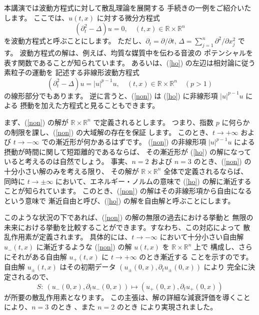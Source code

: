 \documentclass[uplatex,dvipdfmx]{jlreq}
\begin{document}
本講演では波動方程式に対して散乱理論を展開する
手続きの一例をご紹介いたします。
ここでは、$u(t,x)$ に対する微分方程式
\begin{equation}\label{ho}
(\partial_t^2-\Delta)u=0,
\quad (t,x)\in \mathbb{R} \times \mathbb{R}^n
\end{equation}
を波動方程式と呼ぶことにします。
ただし、$\partial_t=\partial/\partial t$,
$\Delta=\sum_{j=1}^n \partial^2/\partial x_j^2$ です。
波動方程式の解は、例えば、均質な媒質中を伝わる音波の
ポテンシャルを表す関数であることが知られています。
あるいは、(\ref{ho}) の左辺は相対論に従う素粒子の運動を
記述する非線形波動方程式
\begin{equation}\label{non}
(\partial_t^2-\Delta)u=|u|^{p-1}u,
\quad (t,x)\in {\mathbb R} \times {\mathbb R}^n \quad
(p>1)
\end{equation}
の線形部分でもあります。
逆に言うと、(\ref{non}) は (\ref{ho}) に非線形項
$|u|^{p-1}u$
による
摂動を加えた方程式と見ることもできます。

まず、(\ref{non}) の解が ${\mathbb R} \times {\mathbb R}^n$
で定義されるとします。
つまり、指数 $p$ に何らかの制限を課し、(\ref{non}) の大域解の存在を保証
します。
このとき、$t \to +\infty$ および $t \to -\infty$ での漸近形が何かあるはずです。
(\ref{non}) の非線形項 $|u|^{p-1}u$ による摂動が時間に関して短距離的であるならば、
その漸近形が (\ref{ho}) の解になっていると考えるのは自然でしょう。
事実、$n=2$ および $n=3$ のとき、(\ref{non}) の十分小さい解のみを考える限り、
その解が ${\mathbb R} \times {\mathbb R}^n$ 全体で定義されるならば、
同時に $t \to \pm\infty$ において、エネルギー・ノルムの意味で
(\ref{ho}) の解に漸近することが知られています。
このとき、(\ref{non}) の解はその非線形項から自由になるという意味で
漸近自由と呼び、(\ref{ho}) の解を自由解と呼ぶことにします。

このような状況の下であれば、(\ref{non}) の解の無限の過去における挙動と
無限の未来における挙動を比較することができます。すなわち、この対応によって
散乱作用素が定義されます。
具体的には、$t \to -\infty$ において十分小さい自由解 $u_-(t,x)$
に漸近するような (\ref{non}) の解 $u(t,x)$ を ${\mathbb R} \times {\mathbb R}^n$ 上で
構成し、さらにそれがある自由解 $u_+(t,x)$ に $t \to +\infty$ のとき漸近する
ことを示すのです。
自由解 $u_\pm(t,x)$ はその初期データ
$(u_\pm(0,x),\partial_t u_\pm(0,x))$ により
完全に決定されるので、
\begin{equation}\label{s}
S:~(u_-(0,x),\partial_t u_-(0,x)) \longmapsto
(u_+(0,x),\partial_t u_+(0,x))
\end{equation}
が所要の散乱作用素となります。
この主張は、解の詳細な減衰評価を導くことにより、$n=3$ のとき
\cite{pecher}、また $n=2$ のとき \cite{km} により実現されました。
\end{document}
